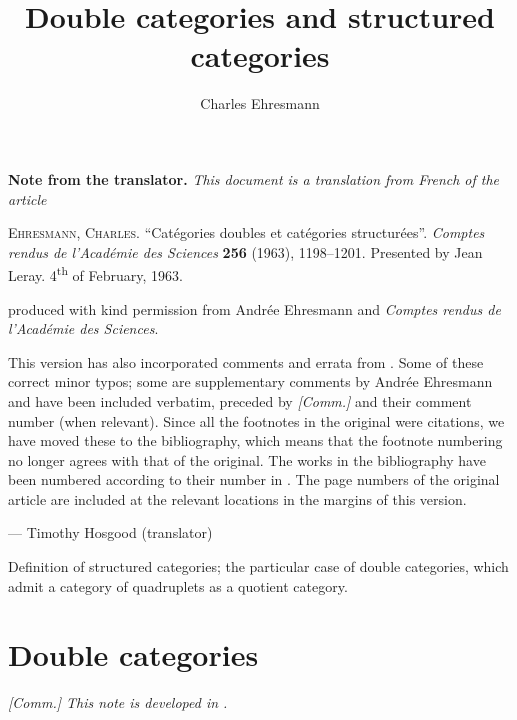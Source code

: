 \documentclass{article}
\title{Double categories and structured categories}
\author{Charles Ehresmann}
\date{}
\newcommand{\origcit}{%
  \textsc{Ehresmann, Charles.}
  ``Catégories doubles et catégories structurées''.
  \emph{Comptes rendus de l'Académie des Sciences} \textbf{256} (1963), 1198--1201.
  Presented by Jean Leray.
  4\textsuperscript{th} of February, 1963.
}
\renewenvironment{abstract}{%
  \quotation
  \normalsize
  \begin{center}\textbf{{\abstractname}}\end{center}
  \par\smallskip\noindent
}{\endquotation}
\newenvironment{translator}[1]
  {\phantomsection\par\medskip\noindent\small\textbf{#1.}\itshape}
  {\par\medskip}
\newcommand{\oldpage}[1]{\marginpar{\footnotesize$\Big\vert$ \textit{p.~#1}}}
\begin{document}
\maketitle

\begin{translator}{Note from the translator}
  This document is a translation from French of the article

  \medskip
  {\normalfont\origcit}

  \medskip
  {\noindent}produced with kind permission from Andrée Ehresmann and \emph{Comptes rendus de l'Académie des Sciences}.

  This version has also incorporated comments and errata from \cite[Comments on Part III-1, p.~339]{coll}.
  Some of these correct minor typos; some are supplementary comments by Andrée Ehresmann and have been included verbatim, preceded by \emph{[Comm.]} and their comment number (when relevant).
  Since all the footnotes in the original were citations, we have moved these to the bibliography, which means that the footnote numbering no longer agrees with that of the original.
  The works in the bibliography have been numbered according to their number in \cite{coll}.
  The page numbers of the original article are included at the relevant locations in the margins of this version.
  
  \hfill--- Timothy Hosgood (translator)
\end{translator}




\begin{abstract}Definition of structured categories; the particular case of double categories, which admit a category of quadruplets as a quotient category.\end{abstract}

\section{Double categories}
\oldpage{1198}

\emph{[Comm.] This note is developed in \cite{63}.}
\end{document}
